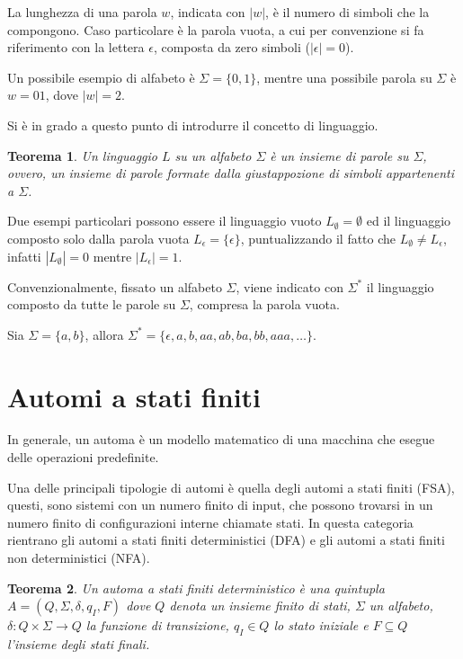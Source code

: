 \documentclass[a4paper,12pt]{report}
\newtheorem{theorem}{Teorema}[chapter]
\begin{document}
La lunghezza di una parola $w$, indicata con $|w|$, è il numero di simboli che la compongono.
Caso particolare è la parola vuota, a cui per convenzione si fa riferimento con la lettera $\epsilon$, composta da zero simboli ($|\epsilon| = 0$).

Un possibile esempio di alfabeto è $\Sigma = \{0, 1\}$, mentre una possibile parola su $\Sigma$ è $w = 01$, dove $|w| = 2$.

Si è in grado a questo punto di introdurre il concetto di linguaggio.

\begin{theorem}\label{th:lang}
  Un linguaggio $L$ su un alfabeto $\Sigma$ è un insieme di parole su $\Sigma$, ovvero, un insieme di parole formate dalla giustappozione di simboli appartenenti a $\Sigma$.
\end{theorem}

Due esempi particolari possono essere il linguaggio vuoto $L_\emptyset = \emptyset$ ed il linguaggio composto solo dalla
parola vuota $L_\epsilon = \{\epsilon\}$, puntualizzando il fatto che $L_\emptyset \neq L_\epsilon$,
infatti $|L_\emptyset| = 0$ mentre $|L_\epsilon| = 1$.

Convenzionalmente, fissato un alfabeto $\Sigma$, viene indicato con $\Sigma^*$ il linguaggio composto da tutte
le parole su $\Sigma$, compresa la parola vuota.

Sia $\Sigma = \{a, b\}$, allora $\Sigma^* = \{\epsilon, a, b, aa, ab, ba, bb, aaa, \dots\}$.

\section{Automi a stati finiti}

In generale, un automa è un modello matematico di una macchina che esegue delle operazioni predefinite.

Una delle principali tipologie di automi è quella degli automi a stati finiti (FSA), questi, sono sistemi
con un numero finito di input, che possono trovarsi in un numero finito di configurazioni interne chiamate stati. 
In questa categoria rientrano gli automi a stati finiti deterministici (DFA) e gli automi a stati finiti 
non deterministici (NFA).

\begin{theorem}
  \label{th:dfa}
  Un automa a stati finiti deterministico è una quintupla \\
  $A = (Q, \Sigma, \delta, q_I, F)$ dove $Q$ denota un insieme finito di stati, $\Sigma$ un alfabeto, \\
  $\delta: Q \times \Sigma \rightarrow Q$ la funzione di transizione, $q_I \in Q$ lo stato iniziale e $F \subseteq Q$ l'insieme degli stati finali.
\end{theorem}
\end{document}

